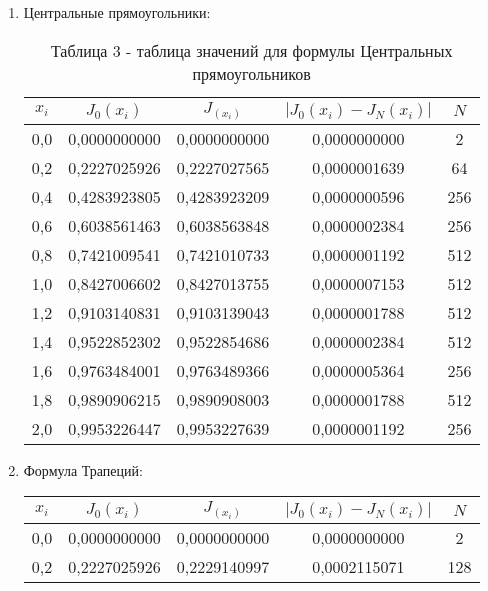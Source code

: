 \documentclass[14pt]{article}
\begin{document}
\begin{enumerate}[label = \arabic*.]
{        \newpage
    }
    \item {Центральные прямоугольники:
        \begin{table}[h]
          \centering
          \begin{tabular}{|c|c|c|c|c|}
            \hline
            $x_i$ & $J_0(x_i)$ & $J_(x_i)$ & $\left|J_0(x_i) - J_N(x_i)\right|$ & $N$\\
            \hline
            0,0 & 0,0000000000 & 0,0000000000 & 0,0000000000 & 2\\
            \hline
            0,2 & 0,2227025926 & 0,2227027565 & 0,0000001639 & 64\\
            \hline
            0,4 & 0,4283923805 & 0,4283923209 & 0,0000000596 & 256\\
            \hline
            0,6 & 0,6038561463 & 0,6038563848 & 0,0000002384 & 256\\
            \hline
            0,8 & 0,7421009541 & 0,7421010733 & 0,0000001192 & 512\\
            \hline
            1,0 & 0,8427006602 & 0,8427013755 & 0,0000007153 & 512\\
            \hline
            1,2 & 0,9103140831 & 0,9103139043 & 0,0000001788 & 512\\
            \hline
            1,4 & 0,9522852302 & 0,9522854686 & 0,0000002384 & 512\\
            \hline
            1,6 & 0,9763484001 & 0,9763489366 & 0,0000005364 & 256\\
            \hline
            1,8 & 0,9890906215 & 0,9890908003 & 0,0000001788 & 512\\
            \hline
            2,0 & 0,9953226447 & 0,9953227639 & 0,0000001192 & 256\\
            \hline
          \end{tabular}
          \caption*{\small{Таблица 3 - таблица значений для формулы Центральных прямоугольников}}
        \end{table}
    }
    \item {Формула Трапеций:
        \begin{table}[h]
          \centering
          \begin{tabular}{|c|c|c|c|c|}
            \hline
            $x_i$ & $J_0(x_i)$ & $J_(x_i)$ & $\left|J_0(x_i) - J_N(x_i)\right|$ & $N$\\
            \hline
            0,0 & 0,0000000000 & 0,0000000000 & 0,0000000000 & 2\\
            \hline
            0,2 & 0,2227025926 & 0,2229140997 & 0,0002115071 & 128\\

\end{tabular}
\end{table}}
\end{enumerate}
\end{document}
